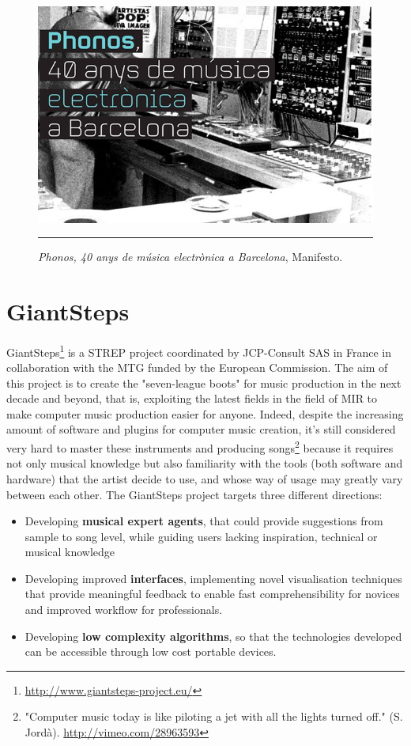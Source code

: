\begin{figure}[htbp]
  \centering
    \includegraphics[scale=0.6]{Figures/electronicmusicexhibition.jpg}
    \rule{35em}{0.5pt}
  \caption[Phonos, 40 anys de música electrònica a Barcelona]{\textit{Phonos, 40 anys de música electrònica a Barcelona}, Manifesto.}
  \label{fig:phonosmanifesto}
\end{figure}


\section{GiantSteps}
GiantSteps\footnote{\url{http://www.giantsteps-project.eu/}} is a STREP project coordinated by JCP-Consult SAS in France in collaboration with the MTG funded by the European Commission. The aim of this project is to create the "seven-league boots" for music production in the next decade and beyond, that is, exploiting the latest fields in the field of MIR to make computer music production easier for anyone. Indeed, despite the increasing amount of software and plugins for computer music creation, it's still considered very hard to master these instruments and producing songs\footnote{ "Computer music today is like piloting a jet with all the lights turned off." (S. Jordà). \url{http://vimeo.com/28963593}} because it requires not only musical knowledge but also familiarity with the tools (both software and hardware) that the artist decide to use, and whose way of usage may greatly vary between each other. The GiantSteps project targets three different directions:
\begin{itemize}
\item Developing \textbf{musical expert agents}, that could provide suggestions from sample to song level, while guiding users lacking inspiration, technical or musical knowledge
\item Developing improved \textbf{interfaces}, implementing novel visualisation techniques that provide meaningful feedback to enable fast comprehensibility for novices and improved workflow for professionals.
\item Developing \textbf{low complexity algorithms}, so that the technologies developed can be accessible through low cost portable devices. 
\end{itemize}

